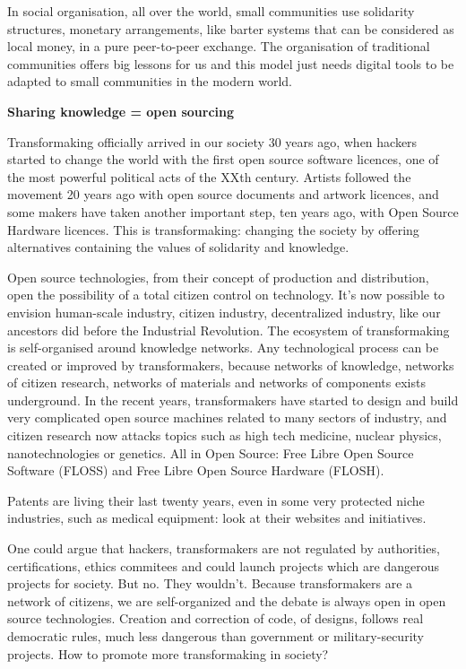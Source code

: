 In social organisation, all over the world, small communities use
solidarity structures, monetary arrangements, like barter systems that
can be considered as local money, in a pure peer-to-peer exchange. The
organisation of traditional communities offers big lessons for us and
this model just needs digital tools to be adapted to small communities
in the modern world.

\textbf{Sharing knowledge = open sourcing}

Transformaking officially arrived in our society 30 years ago, when
hackers started to change the world with the first open source software
licences, one of the most powerful political acts of the XXth century.
Artists followed the movement 20 years ago with open source documents
and artwork licences, and some makers have taken another important step,
ten years ago, with Open Source Hardware licences. This is
transformaking: changing the society by offering alternatives containing
the values of solidarity and knowledge.

Open source technologies, from their concept of production and
distribution, open the possibility of a total citizen control on
technology. It's now possible to envision human-scale industry, citizen
industry, decentralized industry, like our ancestors did before the
Industrial Revolution. The ecosystem of transformaking is self-organised
around knowledge networks. Any technological process can be created or
improved by transformakers, because networks of knowledge, networks of
citizen research, networks of materials and networks of components
exists underground. In the recent years, transformakers have started to
design and build very complicated open source machines related to many
sectors of industry, and citizen research now attacks topics such as
high tech medicine, nuclear physics, nanotechnologies or genetics. All
in Open Source: Free Libre Open Source Software (FLOSS) and Free Libre
Open Source Hardware (FLOSH).

Patents are living their last twenty years, even in some very protected
niche industries, such as medical equipment: look at their websites and
initiatives.

One could argue that hackers, transformakers are not regulated by
authorities, certifications, ethics commitees and could launch projects
which are dangerous projects for society. But no. They wouldn't. Because
transformakers are a network of citizens, we are self-organized and the
debate is always open in open source technologies. Creation and
correction of code, of designs, follows real democratic rules, much less
dangerous than government or military-security projects. How to promote
more transformaking in society?


